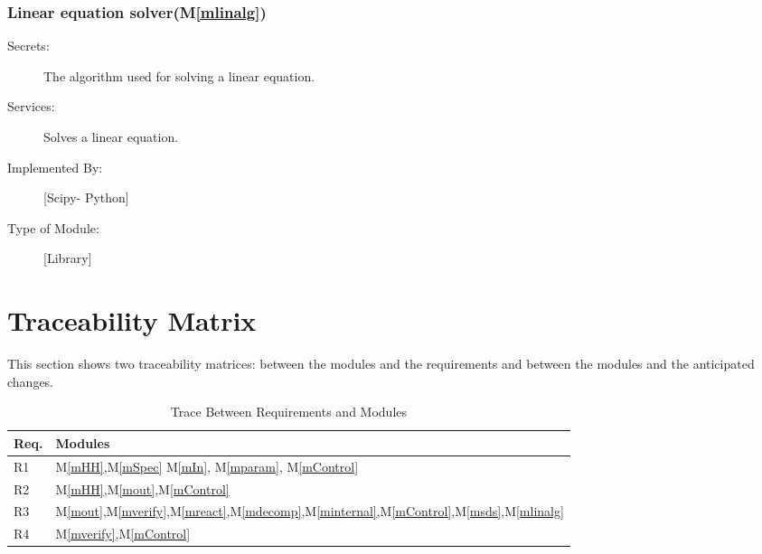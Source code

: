 \documentclass[12pt, titlepage]{article}
\newcommand{\mref}[1]{M\ref{#1}}
\begin{document}
\subsubsection{Linear equation solver(\mref{mlinalg})}

\begin{description}
\item[Secrets:]The algorithm used for solving a linear equation.
\item[Services:] Solves a linear equation.
\item[Implemented By:] [Scipy- Python]
\item[Type of Module:] [Library]
  
\end{description}

\section{Traceability Matrix} \label{SecTM}

This section shows two traceability matrices: between the modules and the
requirements and between the modules and the anticipated changes.

\begin{table}[H]
\centering
\begin{tabular}{p{} p{}}
\toprule
\textbf{Req.} & \textbf{Modules}\\
\midrule
R1 & \mref{mHH},\mref{mSpec} \mref{mIn}, \mref{mparam}, \mref{mControl}\\
R2 & \mref{mHH},\mref{mout},\mref{mControl}\\
R3 & \mref{mout},\mref{mverify},\mref{mreact},\mref{mdecomp},\mref{minternal},\mref{mControl},\mref{msds},\mref{mlinalg}\\
R4 & \mref{mverify},\mref{mControl} \\

\bottomrule
\end{tabular}
\caption{Trace Between Requirements and Modules}
\label{TblRT}
\end{table}
\end{document}

